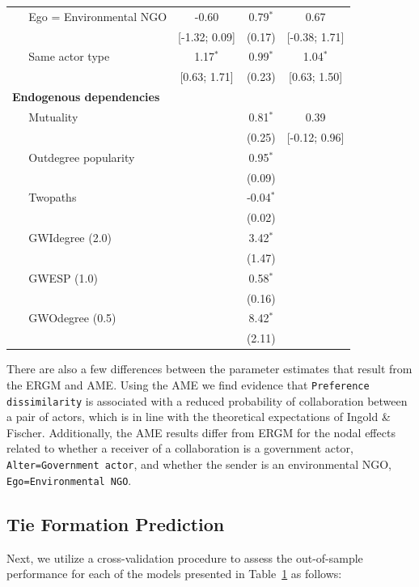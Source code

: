 \documentclass[12pt,twocolumn,twoside]{pnas-new}
\begin{document}
\begin{table}[ht]
\begin{tabular}{lccc}
  $\;\;\;\;$ Ego = Environmental NGO & -0.60 & 0.79$^{\ast}$ & 0.67 \\
  & [-1.32; 0.09] & (0.17) & [-0.38; 1.71] \\
  $\;\;\;\;$ Same actor type & 1.17$^{\ast}$ & 0.99$^{\ast}$ & 1.04$^{\ast}$ \\
   & [0.63; 1.71] & (0.23) & [0.63; 1.50] \\
  \textbf{Endogenous dependencies}  &  &  &  \\
  $\;\;\;\;$ Mutuality &  & 0.81$^{\ast}$ & 0.39 \\
   &  & (0.25) & [-0.12; 0.96] \\
  $\;\;\;\;$ Outdegree popularity  &  & 0.95$^{\ast}$ &  \\
   &  & (0.09) &  \\
  $\;\;\;\;$ Twopaths  &  & -0.04$^{\ast}$ &  \\
  &  & (0.02) &  \\
  $\;\;\;\;$ GWIdegree (2.0)  &  & 3.42$^{\ast}$ &  \\
   &  & (1.47) &  \\
  $\;\;\;\;$ GWESP (1.0)  &  & 0.58$^{\ast}$ &  \\
   &  & (0.16) &  \\
  $\;\;\;\;$ GWOdegree (0.5)  &  & 8.42$^{\ast}$ &  \\
   &  & (2.11) &  \\
   \hline
\hline
\end{tabular}
\label{tab:regTable}
\end{table}
\FloatBarrier

There are also a few differences between the parameter estimates that result from the ERGM and AME. Using the AME we find evidence that \texttt{Preference dissimilarity} is associated with a reduced probability of collaboration between a pair of actors, which is in line with the theoretical expectations of Ingold \& Fischer. Additionally, the AME results differ from ERGM for the nodal effects related to whether a receiver of a collaboration is a government actor, \texttt{Alter=Government actor}, and whether the sender is an environmental NGO, \texttt{Ego=Environmental NGO}.

\subsection*{Tie Formation Prediction}

Next, we utilize a cross-validation procedure to assess the out-of-sample performance for each of the models presented in Table~\ref{tab:regTable} as follows:
\end{document}
